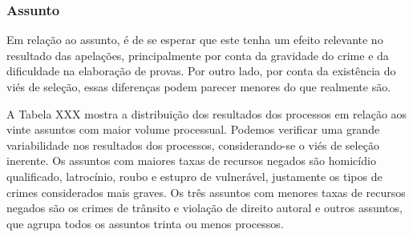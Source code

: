 \documentclass[10pt,]{article}
\begin{document}
\subsubsection{Assunto}\label{assunto}

Em relação ao assunto, é de se esperar que este tenha um efeito
relevante no resultado das apelações, principalmente por conta da
gravidade do crime e da dificuldade na elaboração de provas. Por outro
lado, por conta da existência do viés de seleção, essas diferenças podem
parecer menores do que realmente são.

A Tabela XXX mostra a distribuição dos resultados dos processos em
relação aos vinte assuntos com maior volume processual. Podemos
verificar uma grande variabilidade nos resultados dos processos,
considerando-se o viés de seleção inerente. Os assuntos com maiores
taxas de recursos negados são homicídio qualificado, latrocínio, roubo e
estupro de vulnerável, justamente os tipos de crimes considerados mais
graves. Os três assuntos com menores taxas de recursos negados são os
crimes de trânsito e violação de direito autoral e outros assuntos, que
agrupa todos os assuntos trinta ou menos processos.
\end{document}
